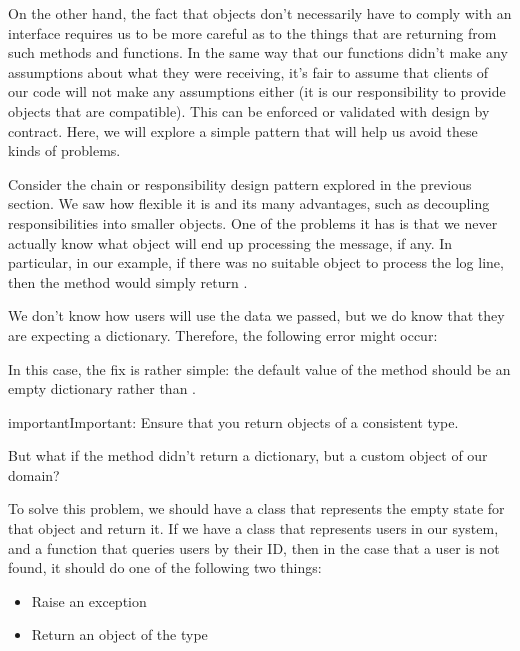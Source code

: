 \documentclass[a4paper,10pt,english]{sphinxmanual}
\begin{document}
On the other hand, the fact that objects don’t necessarily have to comply with an interface
requires us to be more careful as to the things that are returning from such methods and
functions. In the same way that our functions didn’t make any assumptions about what
they were receiving, it’s fair to assume that clients of our code will not make any
assumptions either (it is our responsibility to provide objects that are compatible). This can
be enforced or validated with design by contract. Here, we will explore a simple pattern
that will help us avoid these kinds of problems.

Consider the chain or responsibility design pattern explored in the previous section. We
saw how flexible it is and its many advantages, such as decoupling responsibilities into
smaller objects. One of the problems it has is that we never actually know what object will
end up processing the message, if any. In particular, in our example, if there was no
suitable object to process the log line, then the method would simply return .

We don’t know how users will use the data we passed, but we do know that they are
expecting a dictionary. Therefore, the following error might occur:

\begin{sphinxVerbatim}[commandchars=\\\{\}]
      
\end{sphinxVerbatim}

In this case, the fix is rather simple: the default value of the  method should be
an empty dictionary rather than .

\begin{sphinxadmonition}{important}{Important:}
Ensure that you return objects of a consistent type.
\end{sphinxadmonition}

But what if the method didn’t return a dictionary, but a custom object of our domain?

To solve this problem, we should have a class that represents the empty state for that object
and return it. If we have a class that represents users in our system, and a function that
queries users by their ID, then in the case that a user is not found, it should do one of the
following two things:
\begin{itemize}
\item {} 
Raise an exception

\item {} 
Return an object of the  type

\end{itemize}
\end{document}

